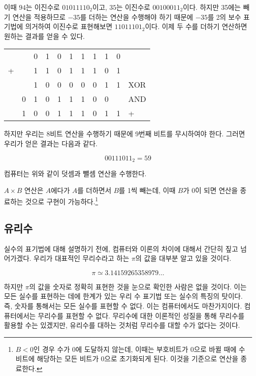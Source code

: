 \documentclass{article}
\begin{document}
이때 $94$는 이진수로 $01011110_2$이고, $35$는 이진수로 $00100011_2$이다.
하지만 35에는 빼기 연산을 적용하므로 $-35$를 더하는 연산을 수행해야 하기 때문에
$-35$를 2의 보수 표기법에 의거하여 이진수로 표현해보면 $11011101_2$이다.
이제 두 수를 더하기 연산하면 원하는 결과를 얻을 수 있다.

\begin{center}
    \begin{tabular}{ccccccccccl}
          &   & 0 & 1 & 0 & 1 & 1 & 1 & 1 & 0 & \\
        + &   & 1 & 1 & 0 & 1 & 1 & 1 & 0 & 1 & \\
        \hline
          &   & 1 & 0 & 0 & 0 & 0 & 0 & 1 & 1 & XOR \\
          & 0 & 1 & 0 & 1 & 1 & 1 & 0 & 0 &   & AND \\
        \hline
          & 1 & 0 & 0 & 1 & 1 & 1 & 0 & 1 & 1 & +
    \end{tabular}
\end{center}

하지만 우리는 8비트 연산을 수행하기 때문에 9번째 비트를 무시하여야 한다.
그러면 우리가 얻은 결과는 다음과 같다.

$$
00111011_2 = 59
$$

컴퓨터는 위와 같이 덧셈과 뺄셈 연산을 수행한다.

$A \times B$ 연산은 $A$에다가 $A$를 더하면서 $B$를 1씩 빼는데, 이때 $B$가 0이 되면 연산을
종료하는 것으로 구현이 가능하다.\footnote{$B < 0$인 경우 수가 0에 도달하지 않는데, 이때는
부호비트가 0으로 바뀔 때에 수 비트에 해당하는 모든 비트가 0으로 초기화되게 된다. 이것을 기준으로
연산을 종료한다.}

\subsection{유리수}

실수의 표기법에 대해 설명하기 전에, 컴퓨터와 이론의 차이에 대해서 간단히 짚고 넘어가겠다.
우리가 대표적인 무리수라고 하는 $\pi$의 값을 대부분 알고 있을 것이다.

$$
\pi \simeq 3.14159265358979 \dots
$$

하지만 $\pi$의 값을 숫자로 정확히 표현한 것을 눈으로 확인한 사람은 없을 것이다.
이는 모든 실수를 표현하는 데에 한계가 있는 우리 수 표기법 또는 실수의 특징의 탓이다.
즉, 숫자를 통해서는 모든 실수를 표현할 수 없다. 이는 컴퓨터에서도 마찬가지이다.
컴퓨터에서는 무리수를 표현할 수 없다. 무리수에 대한 이론적인 성질을 통해 무리수를 활용할 수는
있겠지만, 유리수를 대하는 것처럼 무리수를 대할 수가 없다는 것이다.
\end{document}
